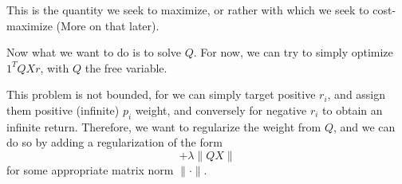 This is the quantity we seek to maximize, or rather with which we seek to cost-maximize
(More on that later).

\starsection

Now what we want to do is to solve $Q$. For now, we can try to simply optimize $1^TQXr$,
with $Q$ the free variable. 

This problem is not bounded, for we can simply target positive $r_i$, and assign them
positive (infinite) $p_i$ weight, and conversely for negative $r_i$ to obtain an infinite
return. Therefore, we want to regularize the weight from $Q$, and we can do so by adding a
regularization of the form
\begin{equation}
  +\lambda \|QX\|
\end{equation}
for some appropriate matrix norm $\|\cdot\|$.
